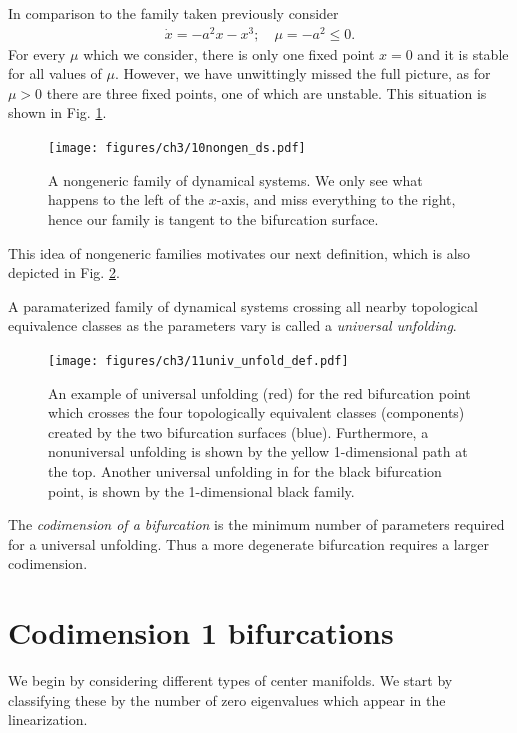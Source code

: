 \begin{ex}
	In comparison to the family taken previously consider
	\begin{align}
		 \dot{x} = -a^2 x -x^3;\quad \mu =-a^2\leq 0.
	\end{align}
	For every $\mu $ which we consider, there is only one fixed point $x=0$ and it is stable for all values of $\mu $. However, we have unwittingly missed the full picture, as for $\mu >0$ there are three fixed points, one of which are unstable. This situation is shown in Fig. \ref{fig:nongen_ds}.
	\begin{figure}[h!]
		\centering
		\texttt{[image: figures/ch3/10nongen\_ds.pdf]}
		\caption{A nongeneric family of dynamical systems. We only see what happens to the left of the $x$-axis, and miss everything to the right, hence our family is tangent to the bifurcation surface.}
		\label{fig:nongen_ds}
	\end{figure}
\end{ex}

This idea of nongeneric families motivates our next definition, which is also depicted in Fig. \ref{fig:univ_unfold_def}.
\begin{definition}
	A paramaterized family of dynamical systems crossing all nearby topological equivalence classes as the parameters vary is called a \emph{universal unfolding}.
\end{definition}
\begin{figure}[h!]
	\centering
	\texttt{[image: figures/ch3/11univ\_unfold\_def.pdf]}
	\caption{An example of universal unfolding (red) for the red bifurcation point which crosses the four topologically equivalent classes (components) created by the two bifurcation surfaces (blue). Furthermore, a nonuniversal unfolding is shown by the yellow 1-dimensional path at the top. Another universal unfolding in for the black bifurcation point, is shown by the 1-dimensional black family.}
	\label{fig:univ_unfold_def}
\end{figure}

\begin{definition} The \emph{codimension of a bifurcation} is the minimum number of parameters required for a universal unfolding. Thus a more degenerate bifurcation requires a larger codimension.
\end{definition}

\section{Codimension 1 bifurcations}
We begin by considering different types of center manifolds. We start by classifying these by the number of zero eigenvalues which appear in the linearization.


